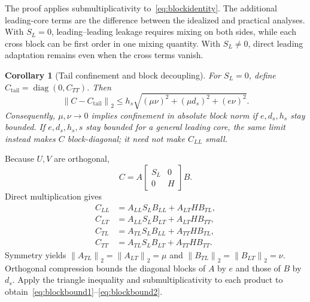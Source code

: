 \documentclass{article}
\newtheorem{corollary}[proposition]{Corollary}
\newcommand{\diag}{\operatorname{diag}}
\newcommand{\op}[1]{\left\|#1\right\|_2}
\begin{document}
The proof applies submultiplicativity to~\eqref{eq:blockidentity}. The additional leading-core terms are the difference between the idealized and practical analyses. With $S_L=0$, leading--leading leakage requires mixing on both sides, while each cross block can be first order in one mixing quantity. With $S_L\ne0$, direct leading adaptation remains even when the cross terms vanish.

\begin{corollary}[Tail confinement and block decoupling]
\label{cor:confinement}
For $S_L=0$, define $C_{\mathrm{tail}}=\diag(0,C_{TT})$. Then
\begin{equation}
\op{C-C_{\mathrm{tail}}}
\le h_s\sqrt{(\mu\nu)^2+(\mu d_s)^2+(e\nu)^2}.
\label{eq:offbound}
\end{equation}
Consequently, $\mu,\nu\to0$ implies confinement in absolute block norm if $e,d_s,h_s$ stay bounded. If $e,d_s,h_s,s$ stay bounded for a general leading core, the same limit instead makes $C$ block-diagonal; it need not make $C_{LL}$ small.
\end{corollary}


Because $U,V$ are orthogonal,
\begin{equation}
C=A\begin{bmatrix}S_L&0\\0&H\end{bmatrix}B.
\end{equation}
Direct multiplication gives
\begin{align}
C_{LL}&=A_{LL}S_LB_{LL}+A_{LT}HB_{TL},\\
C_{LT}&=A_{LL}S_LB_{LT}+A_{LT}HB_{TT},\\
C_{TL}&=A_{TL}S_LB_{LL}+A_{TT}HB_{TL},\\
C_{TT}&=A_{TL}S_LB_{LT}+A_{TT}HB_{TT}.
\end{align}
Symmetry yields $\op{A_{TL}}=\op{A_{LT}}=\mu$ and $\op{B_{TL}}=\op{B_{LT}}=\nu$. Orthogonal compression bounds the diagonal blocks of $A$ by $e$ and those of $B$ by $d_s$. Apply the triangle inequality and submultiplicativity to each product to obtain~\eqref{eq:blockbound1}--\eqref{eq:blockbound2}.
\end{document}

